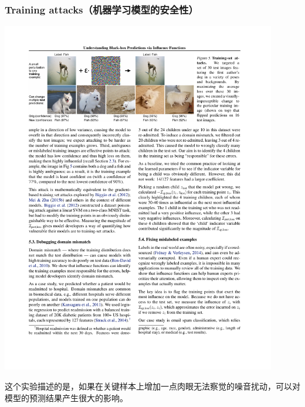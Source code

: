 \documentclass[UTF8]{beamer}
\begin{document}
\begin{frame}
\frametitle{Training attacks（机器学习模型的安全性）}
\begin{center}
\includegraphics[width=0.9\textwidth]{cat.pdf}
\end{center}
这个实验描述的是，如果在关键样本上增加一点肉眼无法察觉的噪音扰动，可以对模型的预测结果产生很大的影响。
\end{frame}
\end{document}
